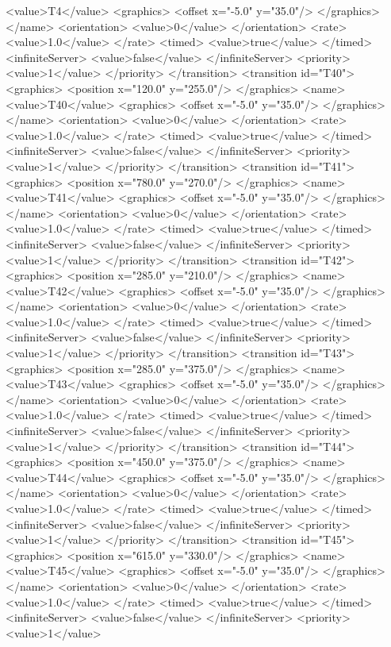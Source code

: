 <value>T4</value>
<graphics>
<offset x="-5.0" y="35.0"/>
</graphics>
</name>
<orientation>
<value>0</value>
</orientation>
<rate>
<value>1.0</value>
</rate>
<timed>
<value>true</value>
</timed>
<infiniteServer>
<value>false</value>
</infiniteServer>
<priority>
<value>1</value>
</priority>
</transition>
<transition id="T40">
<graphics>
<position x="120.0" y="255.0"/>
</graphics>
<name>
<value>T40</value>
<graphics>
<offset x="-5.0" y="35.0"/>
</graphics>
</name>
<orientation>
<value>0</value>
</orientation>
<rate>
<value>1.0</value>
</rate>
<timed>
<value>true</value>
</timed>
<infiniteServer>
<value>false</value>
</infiniteServer>
<priority>
<value>1</value>
</priority>
</transition>
<transition id="T41">
<graphics>
<position x="780.0" y="270.0"/>
</graphics>
<name>
<value>T41</value>
<graphics>
<offset x="-5.0" y="35.0"/>
</graphics>
</name>
<orientation>
<value>0</value>
</orientation>
<rate>
<value>1.0</value>
</rate>
<timed>
<value>true</value>
</timed>
<infiniteServer>
<value>false</value>
</infiniteServer>
<priority>
<value>1</value>
</priority>
</transition>
<transition id="T42">
<graphics>
<position x="285.0" y="210.0"/>
</graphics>
<name>
<value>T42</value>
<graphics>
<offset x="-5.0" y="35.0"/>
</graphics>
</name>
<orientation>
<value>0</value>
</orientation>
<rate>
<value>1.0</value>
</rate>
<timed>
<value>true</value>
</timed>
<infiniteServer>
<value>false</value>
</infiniteServer>
<priority>
<value>1</value>
</priority>
</transition>
<transition id="T43">
<graphics>
<position x="285.0" y="375.0"/>
</graphics>
<name>
<value>T43</value>
<graphics>
<offset x="-5.0" y="35.0"/>
</graphics>
</name>
<orientation>
<value>0</value>
</orientation>
<rate>
<value>1.0</value>
</rate>
<timed>
<value>true</value>
</timed>
<infiniteServer>
<value>false</value>
</infiniteServer>
<priority>
<value>1</value>
</priority>
</transition>
<transition id="T44">
<graphics>
<position x="450.0" y="375.0"/>
</graphics>
<name>
<value>T44</value>
<graphics>
<offset x="-5.0" y="35.0"/>
</graphics>
</name>
<orientation>
<value>0</value>
</orientation>
<rate>
<value>1.0</value>
</rate>
<timed>
<value>true</value>
</timed>
<infiniteServer>
<value>false</value>
</infiniteServer>
<priority>
<value>1</value>
</priority>
</transition>
<transition id="T45">
<graphics>
<position x="615.0" y="330.0"/>
</graphics>
<name>
<value>T45</value>
<graphics>
<offset x="-5.0" y="35.0"/>
</graphics>
</name>
<orientation>
<value>0</value>
</orientation>
<rate>
<value>1.0</value>
</rate>
<timed>
<value>true</value>
</timed>
<infiniteServer>
<value>false</value>
</infiniteServer>
<priority>
<value>1</value>
